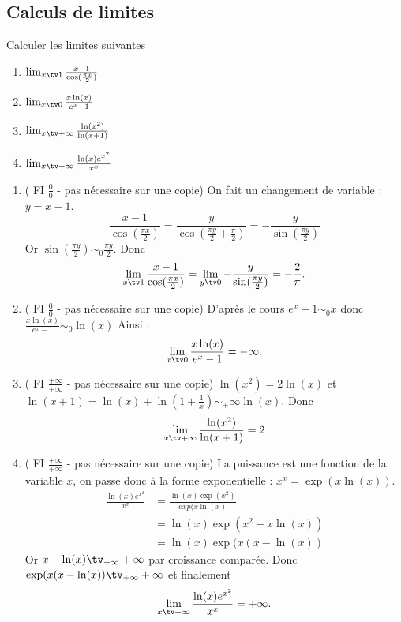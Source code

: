 \subsection{Calculs de limites}

\begin{exercice}
Calculer les limites suivantes 
\begin{enumerate}
\item $\lim_{x\tv 1} \frac{x-1}{\cos(\frac{\pi x}{2})}$
\item $\lim_{x\tv 0} \frac{x\ln(x)}{e^x-1}$
\item $\lim_{x\tv +\infty} \frac{\ln(x^2)}{\ln(x+1)}$
\item $\lim_{x\tv +\infty} \frac{\ln(x) e^{x^2}}{x^x}$
\end{enumerate}
\end{exercice}
\begin{correction}
\begin{enumerate}
\item  ( FI $\frac{0}{0}$ - pas nécessaire sur une copie) 
On fait un changement de variable : $y=x-1$.
$$\frac{x-1}{\cos(\frac{\pi x}{2})} = \frac{y}{\cos(\frac{\pi y}{2}+\frac{\pi}{2})}=-\frac{y}{\sin(\frac{\pi y}{2})}$$
Or $\sin(\frac{\pi y}{2})\sim_0 \frac{\pi y}{2}$. Donc 
$$\lim_{x\tv 1} \frac{x-1}{\cos(\frac{\pi x}{2})} = \lim_{y\tv 0} -\frac{y}{\sin(\frac{\pi y}{2})}= -\frac{2}{\pi}.$$
\item  ( FI $\frac{0}{0}$ - pas nécessaire sur une copie) 
D'après le cours $e^x-1\sim_0 x$ donc $ \frac{x\ln(x)}{e^x-1} \sim_0 \ln(x)$
Ainsi : $$\lim_{x\tv 0} \frac{x\ln(x)}{e^x-1}=-\infty.$$
\item  ( FI $\frac{+\infty}{+\infty}$ - pas nécessaire sur une copie) 
$\ln(x^2)= 2\ln(x)$ et  $\ln(x+1) = \ln(x) + \ln\left( 1+\frac{1}{x}\right)\sim_+\infty \ln(x)$. Donc 
$$\lim_{x\tv +\infty} \frac{\ln(x^2)}{\ln(x+1)}=2$$
\item  ( FI $\frac{+\infty}{+\infty}$ - pas nécessaire sur une copie) 
La puissance est une fonction de la variable $x$, on passe donc à la forme exponentielle : $x^x =\exp(x\ln(x))$.
\begin{align*}
\frac{\ln(x) e^{x^2}}{x^x }&= \frac{\ln(x) \exp(x^2)}{exp(x\ln(x)} \\
&= \ln(x) \exp(x^2-x\ln(x))\\ 
&=\ln(x) \exp(x(x-\ln(x))
\end{align*}
Or $x-\ln(x) \tv_{+\infty} +\infty$ par croissance comparée. Donc $\exp(x(x-\ln(x))\tv_{+\infty} +\infty$  et finalement 
$$\lim_{x\tv +\infty} \frac{\ln(x) e^{x^2}}{x^x} =+\infty.$$

\end{enumerate}

\end{correction}